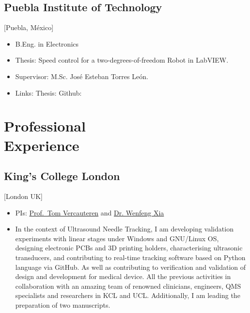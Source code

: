 \documentclass{mycv}
\begin{document}
\subsection{Puebla Institute of Technology}[Puebla, M\'exico]
\vspace{-\parskip}%
\begin{itemize}[label={}]
  \item B.Eng. in Electronics 
  \item Thesis: Speed control for a two-degrees-of-freedom Robot in LabVIEW.
  \item Supervisor: M.Sc. Jos\'e Esteban Torres Le\'on.
  \item	Links: Thesis: \href{https://github.com/mxochicale/publications/blob/master/thesis/B.Eng./doc/MPXochicale_BachelorEngThesis-2003.pdf}{\faFilePdfO} Github: \href{https://github.com/mxochicale/publications/tree/master/thesis/B.Eng.}{\faGithubAlt}
\end{itemize}

\section{Professional \\ Experience}
\subsection{King's College London}[London UK]
\begin{positions}
\end{positions}
\begin{itemize}
  \item PIs: \href{https://cai4cai.ml}{Prof.~Tom Vercauteren} and \href{https://www.kcl.ac.uk/people/wenfeng-xia}{Dr. Wenfeng Xia}
  \item In the context of Ultrasound Needle Tracking,
	I am developing validation experiments with linear stages under Windows and GNU/Linux OS, 
	designing electronic PCBs and 3D printing holders, 
	characterising ultrasonic transducers, 
	and contributing to real-time tracking software based on Python language
	via GitHub. 
	As well as contributing to verification and validation 
	of design and development for medical device. 
	All the previous activities in collaboration with an amazing 
	team of renowned clinicians, engineers, QMS specialists and researchers in KCL and UCL.
	Additionally, I am leading the preparation of two manuscripts.
\end{itemize}
\end{document}
